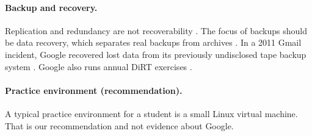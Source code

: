 \paragraph{Backup and recovery.}
Replication and redundancy are not recoverability \cite{sre-book}. The focus of backups should be data recovery, which separates real backups from archives \cite{sre-book}. In a 2011 Gmail incident, Google recovered lost data from its previously undisclosed tape backup system \cite{sre-book}. Google also runs annual DiRT exercises \cite{bsrs}.

\paragraph{Practice environment (recommendation).}
A typical practice environment for a student is a small Linux virtual machine. That is our recommendation and not evidence about Google.

